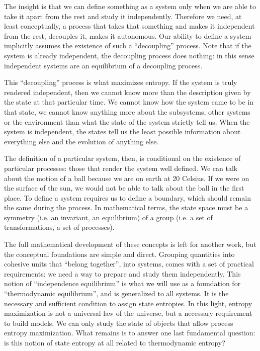 \documentclass[letterpaper,twocolumn]{article}
\begin{document}
The insight is that we can define something as a system only when we are able to take it apart from the rest and study it independently. Therefore we need, at least conceptually, a process that takes that something and makes it independent from the rest, decouples it, makes it autonomous. Our ability to define a system implicitly assumes the existence of such a ``decoupling'' process. Note that if the system is already independent, the decoupling process does nothing: in this sense independent systems are an equilibrium of a decoupling process.

This ``decoupling'' process is what maximizes entropy. If the system is truly rendered independent, then we cannot know more than the description given by the state at that particular time. We cannot know how the system came to be in that state, we cannot know anything more about the subsystems, other systems or the environment than what the state of the system strictly tell us.   When the system is independent, the states tell us the least possible information about everything else and the evolution of anything else.

The definition of a particular system, then, is conditional on the existence of particular processes: those that render the system well defined. We can talk about the motion of a ball because we are on earth at 20 Celsius. If we were on the surface of the sun, we would not be able to talk about the ball in the first place. To define a system requires us to define a boundary, which should remain the same during the process. In mathematical terms, the state space must be a symmetry (i.e. an invariant, an equilibrium) of a group (i.e. a set of transformations, a set of processes).

The full mathematical development of these concepts is left for another work, but the conceptual foundations are simple and direct. Grouping quantities into cohesive units that ``belong together'', into systems, comes with a set of practical requirements: we need a way to prepare and study them independently. This notion of ``independence equilibrium'' is what we will use as a foundation for ``thermodynamic equilibrium'', and is generalized to all systems. It is the necessary and sufficient condition to assign state entropies. In this light, entropy maximization is not a universal law of the universe, but a necessary requirement to build models. We can only study the state of objects that allow process entropy maximization. What remains is to answer one last fundamental question: is this notion of state entropy at all related to thermodynamic entropy?
\end{document}
